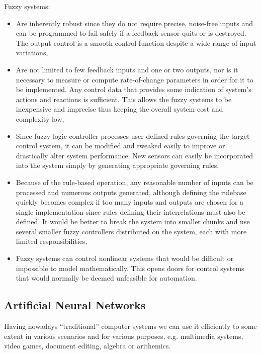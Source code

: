 Fuzzy systems:
\begin{itemize}
\item Are inherently robust since they do not require precise, noise-free inputs and can be programmed to fail safely if a feedback sensor quits or is destroyed. The output control is a smooth control function despite a wide range of input variations,
\item Are not limited to few feedback inputs and one or two outputs, nor is it necessary to measure or compute rate-of-change parameters in order for it to be implemented. Any control data that provides some indication of system's actions and reactions is sufficient. This allows the fuzzy systems to be inexpensive and imprecise thus keeping the overall system cost and complexity low,
\item Since fuzzy logic controller processes user-defined rules governing the target control system, it can be modified and tweaked easily to improve or drastically alter system performance. New sensors can easily be incorporated into the system simply by generating appropriate governing rules,
\item Because of the rule-based operation, any reasonable number of inputs can be processed and numerous outputs generated, although defining the rulebase quickly becomes complex if too many inputs and outputs are chosen for a single implementation since rules defining their interrelations must also be defined. It would be better to break the system into smaller chunks and use several smaller fuzzy controllers distributed on the system, each with more limited responsibilities,
\item Fuzzy systems can control nonlinear systems that would be difficult or impossible to model mathematically. This opens doors for control systems that would normally be deemed unfeasible for automation.
\end{itemize}

\clearpage
\subsection{Artificial Neural Networks}
Having nowadays ``traditional'' computer systems we can use it efficiently to some extent in various scenarios and for various purposes, e.g. multimedia systems, video games, document editing, algebra or arithemics.

